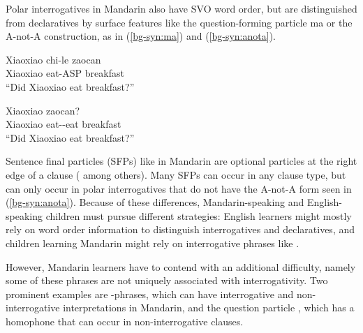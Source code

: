 \noindent 
Polar interrogatives in Mandarin also have SVO word order, but are distinguished from declaratives by surface features like the question-forming particle ma or the A-not-A construction, as in (\ref{bg-syn:ma}) and (\ref{bg-syn:anota}).

\vspace{-2ex} 
\noindent
\begin{minipage}[t]{0.45\linewidth}	
\gll Xiaoxiao	chi-le	zaocan		\\
Xiaoxiao	eat-ASP	breakfast	\Sfp{}\\
``Did Xiaoxiao eat breakfast?''
\eex
\end{minipage}
\hspace{0.5cm} %
\begin{minipage}[t]{0.5\linewidth} 
\gll Xiaoxiao		zaocan?\\
	Xiaoxiao	eat-\Neg-eat	breakfast\\
	``Did Xiaoxiao eat breakfast?''
\eex
\end{minipage}
\vspace{1ex}

\noindent Sentence final particles (SFPs) like \ma{} in Mandarin are optional particles at the right edge of a clause (\citealt{chao1968, zhudexi, huang1982, cheng1991, liboya2006} among others). Many SFPs can occur in any clause type, but \ma{} can only occur in polar interrogatives that do not have the A-not-A form seen in (\ref{bg-syn:anota}). Because of these differences, Mandarin-speaking and English-speaking children must pursue different strategies: English learners might mostly rely on word order information to distinguish interrogatives and declaratives, and children learning Mandarin might rely on interrogative phrases like . 

However, Mandarin learners have to contend with an additional difficulty, namely some of these phrases are not uniquely associated with interrogativity. Two prominent examples are \twh-phrases, which can have interrogative and non-interrogative interpretations in Mandarin, and the question particle \ma, which has a homophone that can occur in non-interrogative clauses.

